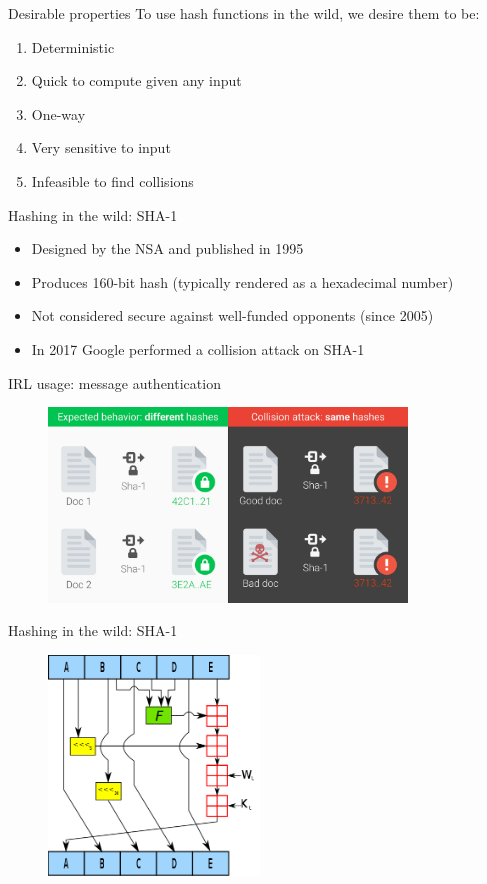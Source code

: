 \documentclass[12pt,aspectratio=169]{beamer}
\renewcommand{\emph}[1]{{\color{mLightBrown}#1}}
\begin{document}
\begin{frame}{Desirable properties}
  To use hash functions in the wild, we desire them to be:
  \begin{enumerate}
    \item Deterministic
    \item Quick to compute given any input
    \item One-way
    \item Very sensitive to input
    \item Infeasible to find collisions
  \end{enumerate}
\end{frame}

\begin{frame}{Hashing in the wild: SHA-1}
  \begin{itemize}
    \item Designed by the NSA and published in 1995
    \item Produces 160-bit hash (typically rendered as a hexadecimal number)
    \item Not considered secure against well-funded opponents (since 2005)
    \item In 2017 Google performed a \emph{collision attack} on SHA-1
  \end{itemize}
\end{frame}

\begin{frame}{IRL usage: message authentication}
  \begin{figure}
    \includegraphics[width=0.85\textwidth]{hash_collision.png}
  \end{figure}
\end{frame}

\begin{frame}{Hashing in the wild: SHA-1}
  \begin{figure}
    \includegraphics[width=0.5\textwidth]{sha1.png}
  \end{figure}
\end{frame}
\end{document}
